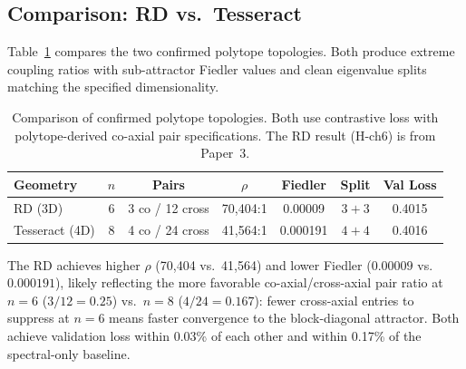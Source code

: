 \subsection{Comparison: RD vs.\ Tesseract}

Table~\ref{tab:rd_vs_tess} compares the two confirmed polytope
topologies. Both produce extreme coupling ratios with sub-attractor
Fiedler values and clean eigenvalue splits matching the specified
dimensionality.

\begin{table}[H]
\centering
\caption{Comparison of confirmed polytope topologies. Both use
  contrastive loss with polytope-derived co-axial pair
  specifications. The RD result (H-ch6) is from Paper~3.}
\label{tab:rd_vs_tess}
\small
\begin{tabular}{lcccccc}
\toprule
Geometry & $n$ & Pairs & $\rho$ & Fiedler & Split & Val Loss \\
\midrule
RD (3D) & 6 & 3 co / 12 cross & 70{,}404:1 & 0.00009 & $3{+}3$ & 0.4015 \\
Tesseract (4D) & 8 & 4 co / 24 cross & 41{,}564:1 & 0.000191 & $4{+}4$ & 0.4016 \\
\bottomrule
\end{tabular}
\end{table}

The RD achieves higher $\rho$ (70{,}404 vs.\ 41{,}564) and lower
Fiedler ($0.00009$ vs.\ $0.000191$), likely reflecting the more
favorable co-axial/cross-axial pair ratio at $n = 6$ ($3/12 = 0.25$)
vs.\ $n = 8$ ($4/24 = 0.167$): fewer cross-axial entries to suppress
at $n = 6$ means faster convergence to the block-diagonal attractor.
Both achieve validation loss within 0.03\% of each other and within
0.17\% of the spectral-only baseline.
